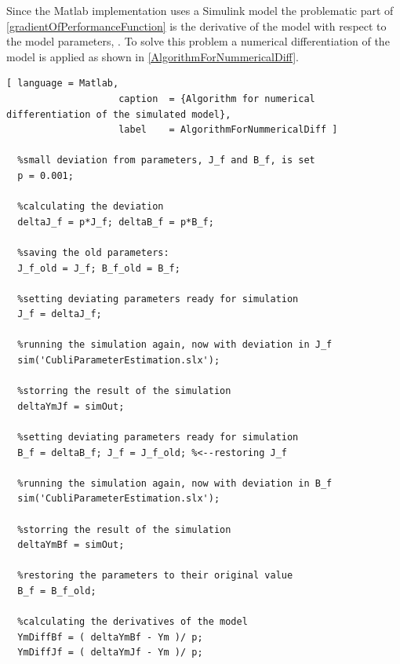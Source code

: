 Since the Matlab implementation uses a Simulink model the problematic part of \eqref{gradientOfPerformanceFunction} is the derivative of the model with respect to the model parameters, \si{}. To solve this problem a numerical differentiation of the model is applied as shown in \autoref{AlgorithmForNummericalDiff}.

\begin{lstlisting}[ language = Matlab,
                    caption  = {Algorithm for numerical differentiation of the simulated model},
                    label    = AlgorithmForNummericalDiff ]

  %small deviation from parameters, J_f and B_f, is set
  p = 0.001;
  
  %calculating the deviation
  deltaJ_f = p*J_f; deltaB_f = p*B_f;
  
  %saving the old parameters:
  J_f_old = J_f; B_f_old = B_f;
  
  %setting deviating parameters ready for simulation
  J_f = deltaJ_f;
  
  %running the simulation again, now with deviation in J_f
  sim('CubliParameterEstimation.slx');
  
  %storring the result of the simulation
  deltaYmJf = simOut;
  
  %setting deviating parameters ready for simulation
  B_f = deltaB_f; J_f = J_f_old; %<--restoring J_f
  
  %running the simulation again, now with deviation in B_f
  sim('CubliParameterEstimation.slx');
  
  %storring the result of the simulation
  deltaYmBf = simOut;
  
  %restoring the parameters to their original value
  B_f = B_f_old;
  
  %calculating the derivatives of the model
  YmDiffBf = ( deltaYmBf - Ym )/ p;
  YmDiffJf = ( deltaYmJf - Ym )/ p;
\end{lstlisting}

